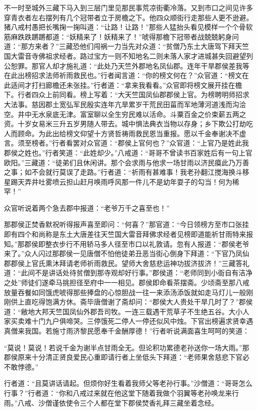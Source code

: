 \documentclass[12pt,UTF8]{ctexbook}
\begin{document}
{	不一时至城外三藏下马入到三层门里见那民事荒凉街衢冷落。又到市口之间见许多穿青衣者左右摆列有几个冠带者立于房檐之下。他四众顺街行走那些人更不逊避。猪八戒村愚把长嘴掬一掬叫道：“让路！让路！”那些人猛抬头看见模样一个个骨软筋麻跌跌蹡蹡都道：“妖精来了！妖精来了！”唬得那檐下冠带者战兢兢躬身问道：“那方来者？”三藏恐他们闯祸一力当先对众道：“贫僧乃东土大唐驾下拜天竺国大雷音寺佛祖求经者。路过宝方一则不知地名二则未落人家才进城甚失回避望列公恕罪。那官人却才施礼道：“此处乃天竺外郡地名凤仙郡。连年干旱郡侯差我等在此出榜招求法师祈雨救民也。”行者闻言道：“你的榜文何在？”众官道：“榜文在此适间才打扫廊檐还未张挂。”行者道：“拿来我看看。”众官即将榜文展开挂在檐下。行者四众上前同看。榜上写着：“大天竺国凤仙郡郡侯上官。为榜聘明师招求大法事。慈因郡土宽弘军民殷实连年亢旱累岁干荒民田菑而军地薄河道浅而沟浍空。井中无水泉底无津。富室聊以全生穷民难以活命。斗粟百金之价束薪五两之资。十岁女易米三升五岁男随人带去。城中惧法典衣当物以存身；乡下欺公打劫吃人而顾命。为此出给榜文仰望十方贤哲祷雨救民恩当重报。愿以千金奉谢决不虚言。须至榜者。”行者看罢对众官道：“郡侯上官何也？”众官道：“上官乃是姓此我郡侯之姓也。”行者笑道：“此姓却少。”八戒道：“哥哥不曾读书百家姓后有一句上官欧阳。”三藏道：“徒弟们且休闲讲。那个会求雨与他求一场甘雨以济民瘼此乃万善之事；如不会就行莫误了走路。”行者道：“祈雨有甚难事！我老孙翻江搅海换斗移星踢天弄井吐雾喷云担山赶月唤雨呼风那一件儿不是幼年耍子的勾当！何为稀罕！”
	
	众官听说着两个急去郡中报道：“老爷万千之喜至也！”
	
	那郡侯正焚香默祝听得报声喜至即问：“何喜？”那官道：“今日领榜方至市口张挂即有四个和尚称是东土大唐差往天竺国大雷音拜佛求经者见榜即道能祈甘雨特来报知。”那郡侯即整衣步行不用轿马多人径至市口以礼敦请。忽有人报道：“郡侯老爷来了。”众人闪过那郡侯一见唐僧不怕他徒弟丑恶当街心倒身下拜道：“下官乃凤仙郡郡侯上官氏熏沐拜请老师祈雨救民。望师大舍慈悲运神功拔济拔济！”三藏答礼道：“此间不是讲话处待贫僧到那寺观却好行事。”郡侯道：“老师同到小衙自有洁净之处”师徒们遂牵马挑担径至府中一一相见。郡侯即命看茶摆斋。少顷斋至那八戒放量吞餐如同饿虎唬得那些捧盘的心惊胆战一往一来添汤添饭就如走马灯儿一般刚刚供上直吃得饱满方休。斋毕唐僧谢了斋却问：“郡侯大人贵处干旱几时了？”郡侯道：“敝地大邦天竺国凤仙外郡吾司牧。一连三载遇干荒草子不生绝五谷。大小人家买卖难十门九户俱啼哭。三停饿死二停人一停还似风中烛。下官出榜遍求贤幸遇真僧来我国。若施寸雨济黎民愿奉千金酬厚德！”行者听说满面喜生呵呵的笑道：
	
	“莫说！莫说！若说千金为谢半点甘雨全无。但论积功累德老孙送你一场大雨。”那郡侯原来十分清正贤良爱民心重即请行者上坐低头下拜道：“老师果舍慈悲下官必不敢悖德。”
	
	行者道：“且莫讲话请起。但烦你好生看着我师父等老孙行事。”沙僧道：“哥哥怎么行事？”行者道：“你和八戒过来就在他这堂下随着我做个羽翼等老孙唤龙来行雨。”八戒、沙僧谨依使令三个人都在堂下郡侯焚香礼拜三藏坐着念经。
	
}
\end{document}
